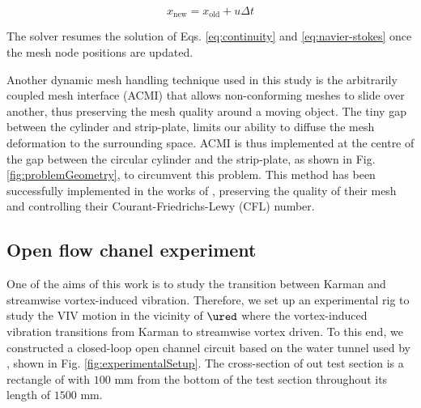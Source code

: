 \documentclass[a4paper,fleqn]{cas-sc}
\begin{document}
\begin{equation}
  x_{\text{new}} = x_{\text{old}} + u \Delta t
  \label{eq:meshNodeUpdate}
\end{equation}

\noindent The solver resumes the solution of Eqs. \ref{eq:continuity} and \ref{eq:navier-stokes} once the mesh node positions are updated.

Another dynamic mesh handling technique used in this study is the arbitrarily coupled mesh interface (ACMI) that allows non-conforming meshes to slide over another, thus preserving the mesh quality around a moving object. The tiny gap between the cylinder and strip-plate, limits our ability to diffuse the mesh deformation to the surrounding space. ACMI is thus implemented at the centre of the gap between the circular cylinder and the strip-plate, as shown in Fig. \ref{fig:problemGeometry}, to circumvent this problem. This method has been successfully implemented in the works of \citet{Ding2015b,Zhang2018}, preserving the quality of their mesh and controlling their Courant-Friedrichs-Lewy (CFL) number.

\subsection{Open flow chanel experiment} \label{ssec:openFlowExp}

One of the aims of this work is to study the transition between Karman and streamwise vortex-induced vibration. Therefore, we set up an experimental rig to study the VIV motion in the vicinity of $\ured$ where the vortex-induced vibration transitions from Karman to streamwise vortex driven. To this end, we constructed a closed-loop open channel circuit based on the water tunnel used by \citet{Nguyen2012}, shown in Fig. \ref{fig:experimentalSetup}. The cross-section of out test section is a rectangle of with $100$ mm from the bottom of the test section throughout its length of $1500$ mm.
\end{document}
